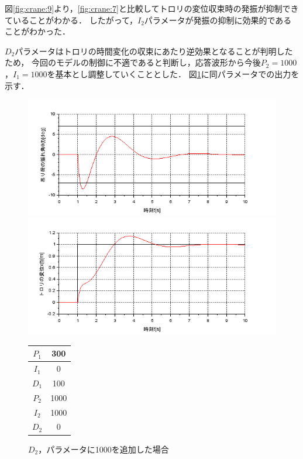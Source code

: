 \documentclass[dvipdfmx,titlepage,a4j]{jsarticle}  %
\begin{document}
図\ref{fig:crane:9}より，\ref{fig:crane:7}と比較してトロリの変位収束時の発振が抑制できていることがわかる．
したがって，$I_2$パラメータが発振の抑制に効果的であることがわかった．

$D_2$パラメータはトロリの時間変化の収束にあたり逆効果となることが判明したため，
今回のモデルの制御に不適であると判断し，応答波形から今後$P_2 = 1000$，$I_1 = 1000$を基本とし調整していくこととした．
図\ref{fig:crane:10}に同パラメータでの出力を示す．

\begin{figure}[H]
  \begin{minipage}{4.5cm}
    \centering
    \includegraphics[keepaspectratio, scale=0.35]{../graph/crane/ang-P1-300-I1-0-D1-100-P2-1000-I2-1000-D2-0.png}
  \end{minipage}
  \hfill
  \begin{minipage}{4.5cm}
    \centering
    \includegraphics[keepaspectratio, scale=0.35]{../graph/crane/po-P1-300-I1-0-D1-100-P2-1000-I2-1000-D2-0.png}
  \end{minipage}
  \hfill
  \begin{minipage}{3cm}
    \begin{center}
      \begin{tabular}{c|c}
        \hline
        $P_1$ & 300  \\ \hline
        $I_1$ & 0    \\ \hline
        $D_1$ & 100  \\ \hline
        $P_2$ & 1000 \\ \hline
        $I_2$ & 1000 \\ \hline
        $D_2$ & 0    \\
        \hline
      \end{tabular}
    \end{center}
  \end{minipage}
  \hfill
  \caption{$D_2$，パラメータに1000を追加した場合}
  \label{fig:crane:10}
\end{figure}
\end{document}
